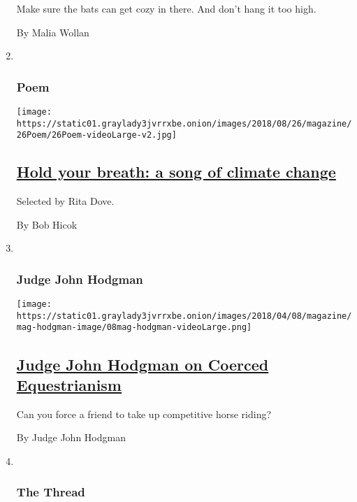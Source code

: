 \begin{enumerate}
  Make sure the bats can get cozy in there. And don't hang it too high.

  By Malia Wollan
\item ~
  \hypertarget{poem}{%
  \subsubsection{Poem}\label{poem}}

  \texttt{[image: https://static01.graylady3jvrrxbe.onion/images/2018/08/26/magazine/26Poem/26Poem-videoLarge-v2.jpg]}

  \hypertarget{hold-your-breath-a-song-of-climate-change}{%
  \subsection{\texorpdfstring{\href{/2018/08/23/magazine/hold-your-breath-a-song-of-climate-change.html}{Hold
  your breath: a song of climate
  change}}{Hold your breath: a song of climate change}}\label{hold-your-breath-a-song-of-climate-change}}

  Selected by Rita Dove.

  By Bob Hicok
\item ~
  \hypertarget{judge-john-hodgman}{%
  \subsubsection{Judge John Hodgman}\label{judge-john-hodgman}}

  \texttt{[image: https://static01.graylady3jvrrxbe.onion/images/2018/04/08/magazine/mag-hodgman-image/08mag-hodgman-videoLarge.png]}

  \hypertarget{judge-john-hodgman-on-coerced-equestrianism}{%
  \subsection{\texorpdfstring{\href{/2018/08/21/magazine/judge-john-hodgman-on-coerced-equestrianism.html}{Judge
  John Hodgman on Coerced
  Equestrianism}}{Judge John Hodgman on Coerced Equestrianism}}\label{judge-john-hodgman-on-coerced-equestrianism}}

  Can you force a friend to take up competitive horse riding?

  By Judge John Hodgman
\item ~
  \hypertarget{the-thread}{%
  \subsubsection{The Thread}\label{the-thread}}


\end{enumerate}
